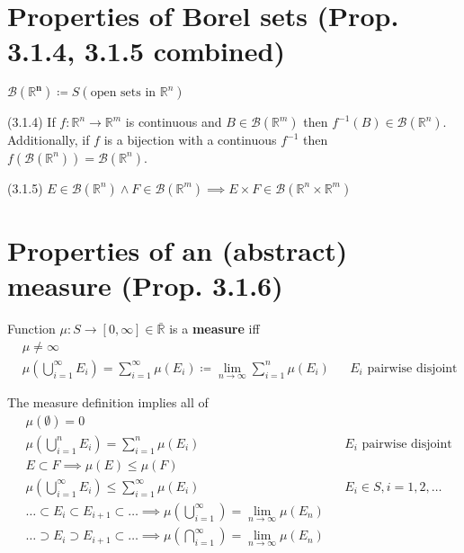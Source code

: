 \documentclass[letterpaper,11pt,intlimits,sumlimits]{amsart}
\newcommand{\Borel}[1]{\mathcal{B}\left({#1}\right)}
\newcommand{\reals}{\mathbb{R}}
\newcommand{\keyphrase}[1]{\textbf{#1}}
\begin{document}
\section*{Properties of Borel sets (Prop. 3.1.4, 3.1.5 combined)}

$\boldsymbol{\Borel{\reals^{n}}} \coloneqq
S\!\left( \text{open sets in $\reals^{n}$} \right)$

(3.1.4) 
If $f:\reals^{n}\to\reals^{m}$ is continuous and $B\in\Borel{\reals^{m}}$
then $f^{-1}\left( B \right)\in\Borel{\reals^{n}}$.
Additionally, if $f$ is a bijection with a continuous $f^{-1}$ then
$f\left( \Borel{\reals^{n}} \right) = \Borel{\reals^{n}}$.

(3.1.5) $E\in\Borel{\reals^{n}} \wedge F\in\Borel{\reals^{m}}
\implies E\times{}F \in \Borel{\reals^{n}\times\reals^{m}}$

\section*{Properties of an (abstract) measure (Prop. 3.1.6)}

Function $\mu:S\to\left[ 0,\infty \right] \in \bar{\reals}$ is a
\keyphrase{measure} iff
\begin{align*}
    &\mu \neq \infty
    \tag{i} \\
    &\mu\left( \bigcup_{i=1}^{\infty} E_{i} \right)
    = \sum_{i=1}^{\infty} \mu\left( E_{i} \right)
    \coloneqq \lim_{n\to\infty}\sum_{i=1}^{n} \mu\left( E_{i} \right)
    & &\text{$E_{i}$ pairwise disjoint}
    \tag{ii}
\end{align*}

The measure definition implies all of
\begin{align*}
    & \mu\left( \emptyset \right) = 0
    \tag{3.1.6 i} \\
    &\mu\left( \bigcup_{i=1}^{n} E_{i} \right)
    = \sum_{i=1}^{n} \mu\left( E_{i} \right)
    & &\text{$E_{i}$ pairwise disjoint}
    \tag{3.1.6 ii} \\
    &E\subset{}F \implies \mu\left( E \right)\leq\mu\left( F \right)
    \tag{3.1.6 iii} \\
    &\mu\left( \bigcup_{i=1}^{\infty} E_{i} \right)
    \leq \sum_{i=1}^{\infty} \mu\left( E_{i} \right)
    & &\text{$E_{i}\in{}S, i=1,2,\ldots$}
    \tag{3.1.6 iv} \\
    &\ldots \subset E_{i} \subset E_{i+1} \subset \ldots \implies
    \mu\left( \bigcup_{i=1}^{\infty} \right)
    = \lim_{n\to\infty} \mu\left( E_{n} \right)
    \tag{3.1.6 v} \\
    &\ldots \supset E_{i} \supset E_{i+1} \subset \ldots \implies
    \mu\left( \bigcap_{i=1}^{\infty} \right)
    = \lim_{n\to\infty} \mu\left( E_{n} \right)
    \tag{3.1.6 vi}
\end{align*}
\end{document}
